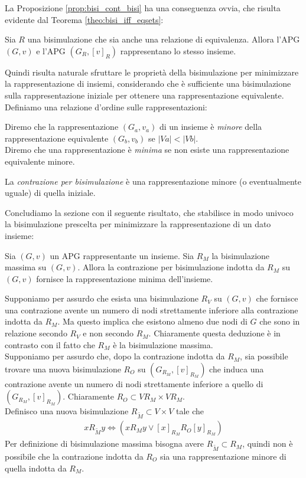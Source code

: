 La Proposizione \ref{prop:bisi_cont_bisi} ha una conseguenza ovvia, che risulta evidente dal Teorema \ref{theo:bisi_iff_eqsets}:
\begin{corollary}
    Sia $R$ una bisimulazione che sia anche una relazione di equivalenza. Allora l'APG $(G, v)$ e l'APG $(G_R, [v]_R)$ rappresentano lo stesso insieme.
\end{corollary}
Quindi risulta naturale sfruttare le proprietà della bisimulazione per minimizzare la rappresentazione di insiemi, considerando che è sufficiente una bisimulazione sulla rappresentazione iniziale per ottenere una rappresentazione equivalente. Definiamo una relazione d'ordine sulle rappresentazioni:
\begin{definition}
    Diremo che la rappresentazione $(G_a, v_a)$ di un insieme è \emph{minore} della rappresentazione equivalente $(G_b, v_b)$ se $|Va| < |Vb|$.\\
    Diremo che una rappresentazione è \emph{minima} se non esiste una rappresentazione equivalente minore.
\end{definition}
\begin{observation}
    La \emph{contrazione per bisimulazione} è una rappresentazione minore (o eventualmente uguale) di quella iniziale.
\end{observation}
Concludiamo la sezione con il seguente risultato, che stabilisce in modo univoco la bisimulazione prescelta per minimizzare la rappresentazione di un dato insieme:
\begin{theorem}
    Sia $(G,v)$ un APG rappresentante un insieme. Sia $R_M$ la bisimulazione massima su $(G,v)$. Allora la contrazione per bisimulazione indotta da $R_M$ su $(G,v)$ fornisce la rappresentazione minima dell'insieme.
\end{theorem}
\begin{proof2}
    Supponiamo per assurdo che esista una bisimulazione $R_V$ su $(G,v)$ che fornisce una contrazione avente un numero di nodi strettamente inferiore alla contrazione indotta da $R_M$. Ma questo implica che esistono almeno due nodi di $G$ che sono in relazione secondo $R_V$ e non secondo $R_M$. Chiaramente questa deduzione è in contrasto con il fatto che $R_M$ è la bisimulazione massima.\\
    Supponiamo per assurdo che, dopo la contrazione indotta da $R_M$, sia possibile trovare una nuova bisimulazione $R_O$ su $(G_{R_M}, [v]_{R_M})$ che induca una contrazione avente un numero di nodi strettamente inferiore a quello di $(G_{R_M}, [v]_{R_M})$. Chiaramente $R_O \subset V{R_M} \times V{R_M}$.\\
    Definisco una nuova bisimulazione $R_{\widetilde{M}} \subset V\times V$ tale che
    \begin{gather*}
        x R_{\widetilde{M}} y \iff (x R_M y \lor [x]_{R_M} R_O [y]_{R_M})
    \end{gather*}
    Per definizione di bisimulazione massima bisogna avere $R_{\widetilde{M}} \subset R_M$, quindi non è possibile che la contrazione indotta da $R_O$ sia una rappresentazione minore di quella indotta da $R_M$.
\end{proof2}

